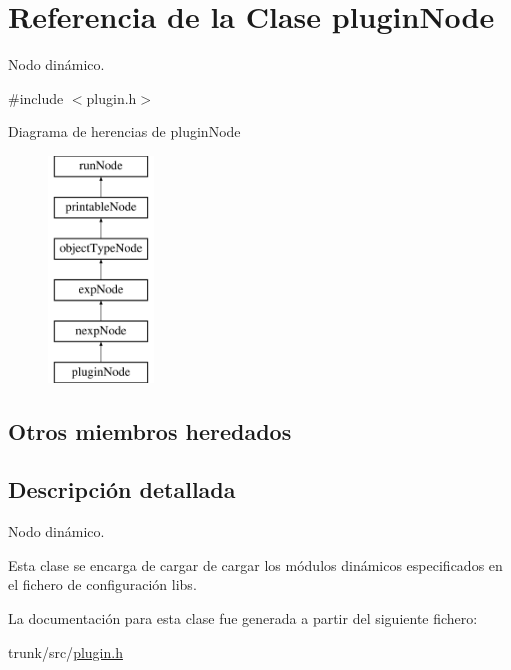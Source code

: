 \hypertarget{classpluginNode}{\section{Referencia de la Clase plugin\-Node}
\label{classpluginNode}
}


Nodo dinámico.  




{\ttfamily \#include $<$plugin.\-h$>$}

Diagrama de herencias de plugin\-Node\begin{figure}[H]
\begin{center}
\leavevmode
\includegraphics[height=6.000000cm]{classpluginNode}
\end{center}
\end{figure}
\subsection*{Otros miembros heredados}


\subsection{Descripción detallada}
Nodo dinámico. 

Esta clase se encarga de cargar de cargar los módulos dinámicos especificados en el fichero de configuración libs. 

La documentación para esta clase fue generada a partir del siguiente fichero\-:\begin{DoxyCompactItemize}
\item 
trunk/src/\hyperlink{plugin_8h}{plugin.\-h}\end{DoxyCompactItemize}
